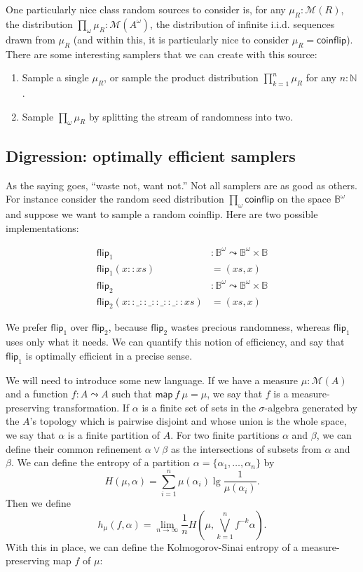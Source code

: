 \documentclass{article}           %
\newcommand{\map}[2]{\mathsf{map}\ {#1}\ {#2}}
\newcommand{\nat}{\mathbb{N}}
\newcommand{\Dist}[1]{\mathcal{M}({#1})}
\newcommand{\coinflip}{\mathsf{coinflip}}
\newcommand{\bool}{\mathbb{B}}
\newcommand{\cons}{::}
\begin{document}
One particularly nice class random sources to consider is, for any $\mu_R : \Dist{R}$, the distribution $\prod_\omega \mu_R : \Dist{A^\omega}$, the distribution of infinite i.i.d. sequences drawn from $\mu_R$ (and within this, it is particularly nice to consider $\mu_R = \coinflip$). There are some interesting samplers that we can create with this source:
\begin{enumerate}
\item Sample a single $\mu_R$, or sample the product distribution $\prod_{k=1}^n \mu_R$ for any $n : \nat$.
\item Sample $\prod_\omega \mu_R$ by splitting the stream of randomness into two.
\end{enumerate}

\subsection{Digression: optimally efficient samplers}

As the saying goes, ``waste not, want not.'' Not all samplers are as good as others. For instance consider the random seed distribution $\prod_\omega \coinflip$ on the space $\bool^\omega$ and suppose we want to sample a random coinflip. Here are two possible implementations:

\begin{align*}
\mathsf{flip}_1 &: \bool^\omega \leadsto \bool^\omega \times \bool
\\ \mathsf{flip}_1 (x \cons xs) &= (xs, x)
\\ \mathsf{flip}_2 &: \bool^\omega \leadsto \bool^\omega \times \bool
\\ \mathsf{flip}_2 (x \cons \_ \cons \_ \cons \_ \cons \_ \cons xs) &= (xs, x)
\end{align*}

We prefer $\mathsf{flip}_1$ over $\mathsf{flip}_2$, because $\mathsf{flip}_2$ wastes precious randomness, whereas $\mathsf{flip}_1$ uses only what it needs. We can quantify this notion of efficiency, and say that $\mathsf{flip}_1$ is optimally efficient in a precise sense.

We will need to introduce some new language. If we have a measure $\mu : \Dist{A}$ and a function $f : A \leadsto A$ such that $\map{f}{\mu} = \mu$, we say that $f$ is a measure-preserving transformation. If $\alpha$ is a finite set of sets in the $\sigma$-algebra generated by the $A$'s topology which is pairwise disjoint and whose union is the whole space, we say that $\alpha$ is a finite partition of $A$. For two finite partitions $\alpha$ and $\beta$, we can define their common refinement $\alpha \vee \beta$ as the intersections of subsets from $\alpha$ and $\beta$. We can define the entropy of a partition $\alpha = \{\alpha_1, \ldots, \alpha_n\}$ by
\[
H(\mu, \alpha) = \sum_{i = 1}^n \mu(\alpha_i) \lg \frac{1}{\mu(\alpha_i)}.
\]
Then we define
\[
h_\mu(f, \alpha) = \lim_{n \to \infty} \frac{1}{n} H\left(\mu, \bigvee_{k = 1}^n f^{-k}\alpha  \right).
\]
With this in place, we can define the Kolmogorov-Sinai entropy of a measure-preserving map $f$ of $\mu$:
\end{document}
